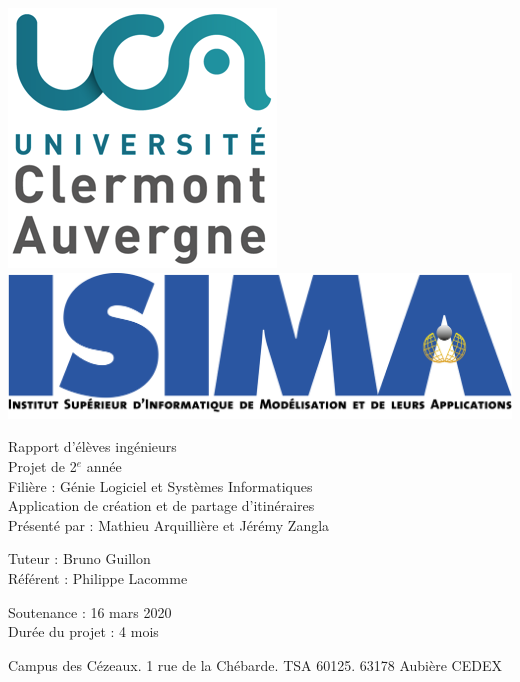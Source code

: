 \begin{titlepage}
\includegraphics[scale=0.3]{images/Logo-UCA.png}
\hfill
\includegraphics[scale=0.3]{images/isima-logo.png}

  \begin{center}
    \begin{minipage}{15cm}
      \begin{center}
        Rapport d'élèves ingénieurs\\
        Projet de 2$^{e}$ année\\
        Filière : Génie Logiciel et Systèmes Informatiques\\
        \vspace{10pt}
        \LARGE Application de création et de partage d'itinéraires\\
        \vspace{30pt}
        \large Présenté par : Mathieu Arquillière et Jérémy Zangla
      \end{center}
    \end{minipage}
  \end{center}

\begin{minipage}{0.4\textwidth}
\begin{flushleft}
  Tuteur : Bruno Guillon\\
  Référent : Philippe Lacomme
\end{flushleft}
\end{minipage}
\hfill
\begin{minipage}{0.4\textwidth}
\begin{flushright}
  Soutenance : 16 mars 2020\\
  Durée du projet : 4 mois
\end{flushright}
\end{minipage}

\begin{center}
Campus des Cézeaux. 1 rue de la Chébarde. TSA 60125. 63178 Aubière CEDEX
\end{center}

\end{titlepage}